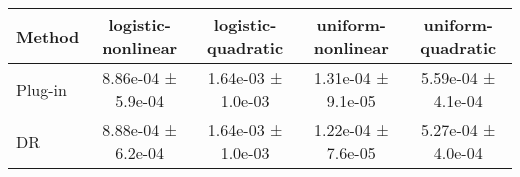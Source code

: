 \begin{tabular}{lcccc}
\toprule
Method & logistic-nonlinear & logistic-quadratic & uniform-nonlinear & uniform-quadratic \\
\midrule
Plug-in & 8.86e-04 ± 5.9e-04 & 1.64e-03 ± 1.0e-03 & 1.31e-04 ± 9.1e-05 & 5.59e-04 ± 4.1e-04 \\
DR & 8.88e-04 ± 6.2e-04 & 1.64e-03 ± 1.0e-03 & 1.22e-04 ± 7.6e-05 & 5.27e-04 ± 4.0e-04 \\
\bottomrule
\end{tabular}
